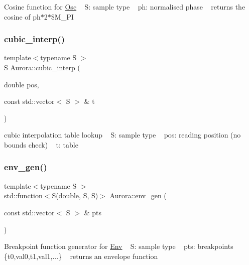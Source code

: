 Cosine function for \hyperlink{class_aurora_1_1_osc}{Osc} ~\newline
S\+: sample type ~\newline
ph\+: normalised phase ~\newline
returns the cosine of ph$\ast$2$\ast$\$\+M\+\_\+\+PI \mbox{\label{namespace_aurora_a35b9cf383290bddedd82b7c3d0f05e81}} 
\subsubsection{\texorpdfstring{cubic\+\_\+interp()}{cubic\_interp()}}
{\footnotesize\ttfamily template$<$typename S $>$ \\
S Aurora\+::cubic\+\_\+interp (\begin{DoxyParamCaption}\item[{double}]{pos,  }\item[{const std\+::vector$<$ S $>$ \&}]{t }\end{DoxyParamCaption})\hspace{0.3cm}{\ttfamily [inline]}}

cubic interpolation table lookup ~\newline
S\+: sample type ~\newline
pos\+: reading position (no bounds check) ~\newline
t\+: table \mbox{\label{namespace_aurora_aeac34405f4d58ec77eb9519844518255}} 
\subsubsection{\texorpdfstring{env\+\_\+gen()}{env\_gen()}}
{\footnotesize\ttfamily template$<$typename S $>$ \\
std\+::function$<$S(double, S, S)$>$ Aurora\+::env\+\_\+gen (\begin{DoxyParamCaption}\item[{const std\+::vector$<$ S $>$ \&}]{pts }\end{DoxyParamCaption})}

Breakpoint function generator for \hyperlink{class_aurora_1_1_env}{Env} ~\newline
S\+: sample type ~\newline
pts\+: breakpoints \{t0,val0,t1,val1,...\} ~\newline
returns an envelope function \mbox{\label{namespace_aurora_a9b89513b24d0d89f0ecd400c899c78ce}} 
